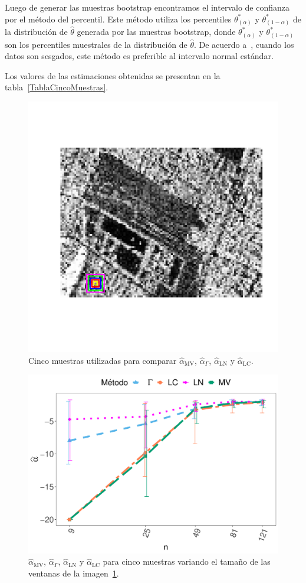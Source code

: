 Luego de generar las muestras bootstrap encontramos el intervalo de confianza por el método del percentil. Este método utiliza los percentiles $\theta^*_{(\alpha)}$ y $\theta^*_{(1-\alpha)}$ de la distribución de $\widehat{\theta}$ generada por las muestras bootstrap, donde $\theta^*_{(\alpha)}$ y $\theta^*_{(1-\alpha)}$ son los percentiles muestrales de la distribución de $\widehat{\theta}$. De acuerdo a~\cite{Efron93}, cuando los datos son sesgados, este método es preferible al intervalo normal estándar.


Los valores de las estimaciones obtenidas se presentan en la tabla~\ref{TablaCincoMuestras}.
\begin{figure}[htb]
	\centering
	\includegraphics[width=0.7\linewidth]{../../Figures/Tesis/ImagenReal/CincoMuestras.pdf}
	\caption{\label{CincoMuestras}\small Cinco muestras utilizadas para comparar  $\widehat{\alpha}_{\text{MV}}$, $\widehat{\alpha}_{\Gamma}$, $\widehat{\alpha}_{\text{LN}}$ y  $\widehat{\alpha}_{\text{LC}}$.}
\end{figure}


\begin{figure}[htb]
	\centering
	\includegraphics[width=0.8\linewidth]{../../Figures/Tesis/ImagenReal/AlfaVsTamCincoMuestras_v2.pdf}
	\caption{\label{AlfaVsTamCincoMuestras}\small $\widehat{\alpha}_{\text{MV}}$, $\widehat{\alpha}_{\Gamma}$, $\widehat{\alpha}_{\text{LN}}$ y  $\widehat{\alpha}_{\text{LC}}$ para cinco muestras variando el tamaño de las ventanas de la imagen~\ref{CincoMuestras}.}
\end{figure}

